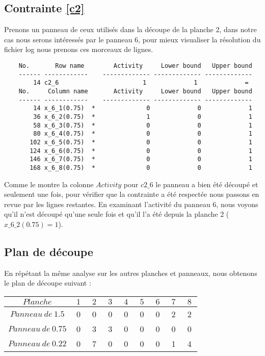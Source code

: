 \documentclass{article}[A4]
\begin{document}
\subsection{Contrainte \ref{c2}}
Prenons un panneau de ceux utilisés dans la découpe de la planche 2, dans 
notre cas nous serons intéressés par le panneau 6, pour mieux visualiser 
la résolution du fichier log nous prenons ces morceaux de lignes.
\begin{verbatim}
	No.       Row name        Activity     Lower bound   Upper bound
	------ ------------    ------------- ------------- -------------
	    14 c2_6                       1             1             = 
	No.     Column name       Activity     Lower bound   Upper bound
	------ ------------    ------------- ------------- -------------
	    14 x_6_1(0.75)  *              0             0             1 
	    36 x_6_2(0.75)  *              1             0             1 
	    58 x_6_3(0.75)  *              0             0             1 
	    80 x_6_4(0.75)  *              0             0             1 
	   102 x_6_5(0.75)  *              0             0             1 
	   124 x_6_6(0.75)  *              0             0             1 
	   146 x_6_7(0.75)  *              0             0             1 
	   168 x_6_8(0.75)  *              0             0             1 
\end{verbatim}
Comme le montre la colonne $Activity$ pour \texttt{$c2\_6$} le 
panneau a bien été découpé et seulement une fois, pour vérifier que la 
contrainte a été respectée nous passons en revue par les lignes restantes. 
En examinant l'activité du panneau 6, nous voyons qu'il n'est découpé
qu'une seule fois et qu'il l'a été depuis la planche 2 
($\texttt{$x\_6\_2(0.75)$} = 1$).
\subsection{Plan de découpe}
En répétant la même analyse sur les autres planches et panneaux, nous
obtenons le plan de découpe suivant :
\begin{center}
	\begin{tabular} {| c | c | c | c | c | c | c | c | c |}
		\hline
		$Planche$				&$\ 1 \ $	&$\ 2 \ $	&$\ 3 \ $	&$\ 4 \ $ 	&$\ 5 \ $	&$\ 6 \ $	&$\ 7 \ $	&$\ 8 \ $	\\
		\hline
		$ Panneau\ de\ 1.5 $	&	0		&	0		& 	0		&	0		&	0		&	0		& 	2		&  	2		\\
		\hline
		$ Panneau\ de\ 0.75$	& 	0		&	3 		& 	3		&	0		&	0		&	0		& 	0		&  	0		\\
		\hline
		$ Panneau\ de\ 0.22$ 	& 	0		&	7		& 	0		&	0		&	0		&	0		& 	1		&  	4		\\
		\hline
	\end{tabular}
\end{center}
\end{document}
